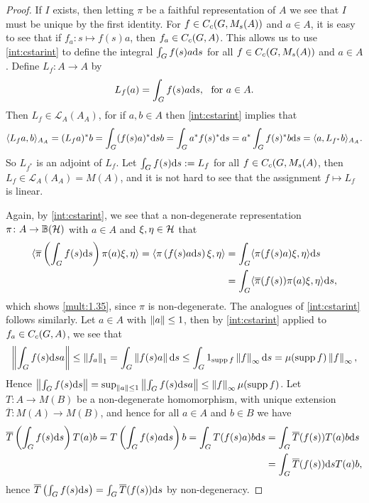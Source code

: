 \begin{proof}
	If $I$ exists, then letting $\pi$ be a faithful representation of $A$ we see that $I$ must be unique by the first identity. For  $f \in C_c(G,M_s(A))$ and $a \in A$, it is easy to see that if $f_a \colon s \mapsto f(s) a$, then $f_a \in C_c(G,A)$. This allows us to use \cref{int:cstarint} to define the integral $\int_G f(s) a \mathrm{d} s$ for all $f \in C_c(G,M_s(A))$ and $a \in A$. Define $L_f \colon A \to A$ by
	\begin{align*}
		L_f(a) = \int_G f(s) a \mathrm{d} s, \ \text{ for } a \in A.
	\end{align*}
	Then $L_f \in \mathcal{L}_A(A_A)$, for if $a,b \in A$ then \cref{int:cstarint} implies that
	\begin{align*}
		\langle L_f a , b \rangle_{A_A} = (L_f a )^* b = \int_G (f(s) a)^* \mathrm{d} s b = \int_G a^* f(s)^* \mathrm{d} s = a^* \int_G f(s)^* b \mathrm{d} s = \langle a , L_{f^*} b\rangle_{A_A}.
	\end{align*}
	So $L_{f^*}$ is an adjoint of $L_f$. Let $\int_G f(s) \mathrm{d} s := L_f$ for all $f \in C_c(G,M_s(A)$, then $L_f \in \mathcal{L}_A(A_A) = M(A)$, and it is not hard to see that the assignment $f \mapsto L_f$ is linear.

	Again, by \cref{int:cstarint}, we see that a non-degenerate representation $\pi \colon A \to \mathbb{B}(\mathcal{H})$ with $a \in A$ and $\xi, \eta \in \mathcal{H}$ that
	\begin{align*}
		\langle \overline \pi \left( \int_G f(s) \mathrm{d} s \right) \pi(a) \xi , \eta \rangle =\langle \pi \left(f(s) a \mathrm{d} s \right) \xi , \eta \rangle &= \int_G \langle \pi(f(s) a) \xi , \eta \rangle \mathrm{d} s\\
		&= \int_G \langle \overline \pi (f(s)) \pi(a) \xi , \eta \rangle \mathrm{d} s,
	\end{align*}
	which shows \cref{mult:1.35}, since $\pi$ is non-degenerate. The analogues of \cref{int:cstarint} follows similarly. Let $a \in A$ with $\left\lVert a \right\rVert \leq 1$, then by \cref{int:cstarint} applied to $f_a \in C_c(G,A)$, we see that
	\begin{align*}
		\left\lVert \int_G f(s) \mathrm{d} s a \right\rVert  \leq \left\lVert f_a \right\rVert_1 = \int_G \left\lVert f(s) a \right\rVert \mathrm{d} s \leq \int_G 1_{\operatorname{supp} f} \left\lVert f \right\rVert_{\infty} \mathrm{d} s = \mu(\operatorname{supp} f) \left\lVert f \right\rVert_{\infty},
	\end{align*}
	Hence $\left\lVert \int_G f(s) \mathrm{d} s \right\rVert = \sup_{\left\lVert a \right\rVert \leq 1} \left\lVert \int_G f(s) \mathrm{d} s a\right\rVert \leq \left\lVert f \right\rVert_{\infty} \mu(\operatorname{supp} f)$. Let $T \colon A \to M(B)$ be a non-degenerate homomorphism, with unique extension $\overline T \colon M(A) \to M(B)$, and hence for all $ a \in A$ and $b \in B$ we have
	\begin{align*}
		\overline T\left(  \int_G f(s) \mathrm{d} s \right) T(a) b = T\left( \int_G f(s) a \mathrm{d} s  \right)b= \int_{G} T(f(s)a ) b \mathrm{d} s &= \int_G \overline T(f(s)) T(a)b \mathrm{d} s \\
		&=\int_G \overline T(f(s)) \mathrm{d} s T(a)b,
	\end{align*}
	hence $\overline T \left( \int_G f(s) \mathrm{d} s \right) = \int_G \overline T(f(s)) \mathrm{d} s$ by non-degeneracy.
\end{proof}
